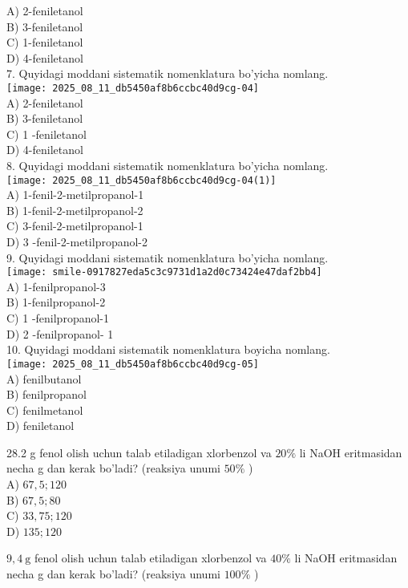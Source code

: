 A) 2-feniletanol\\
B) 3-feniletanol\\
C) 1-feniletanol\\
D) 4-feniletanol\\
7. Quyidagi moddani sistematik nomenklatura bo'yicha nomlang.\\
\texttt{[image: 2025\_08\_11\_db5450af8b6ccbc40d9cg-04]}\\
A) 2-feniletanol\\
B) 3-feniletanol\\
C) 1 -feniletanol\\
D) 4-feniletanol\\
8. Quyidagi moddani sistematik nomenklatura bo'yicha nomlang.\\
\texttt{[image: 2025\_08\_11\_db5450af8b6ccbc40d9cg-04(1)]}\\
A) 1-fenil-2-metilpropanol-1\\
B) 1-fenil-2-metilpropanol-2\\
C) 3-fenil-2-metilpropanol-1\\
D) 3 -fenil-2-metilpropanol-2\\
9. Quyidagi moddani sistematik nomenklatura bo'yicha nomlang.\\
\texttt{[image: smile-0917827eda5c3c9731d1a2d0c73424e47daf2bb4]}\\
A) 1-fenilpropanol-3\\
B) 1-fenilpropanol-2\\
C) 1 -fenilpropanol-1\\
D) 2 -fenilpropanol- 1\\
10. Quyidagi moddani sistematik nomenklatura boyicha nomlang.\\
\texttt{[image: 2025\_08\_11\_db5450af8b6ccbc40d9cg-05]}\\
A) fenilbutanol\\
B) fenilpropanol\\
C) fenilmetanol\\
D) feniletanol
  \item 28.2 g fenol olish uchun talab etiladigan xlorbenzol va $20 \%$ li NaOH eritmasidan necha g dan kerak bo'ladi? (reaksiya unumi $50 \%$ )\\
A) $67,5 ; 120$\\
B) $67,5 ; 80$\\
C) $33,75 ; 120$\\
D) $135 ; 120$
  \item $9,4 \mathrm{~g}$ fenol olish uchun talab etiladigan xlorbenzol va $40 \%$ li NaOH eritmasidan necha g dan kerak bo'ladi? (reaksiya unumi $100 \%$ )\\
